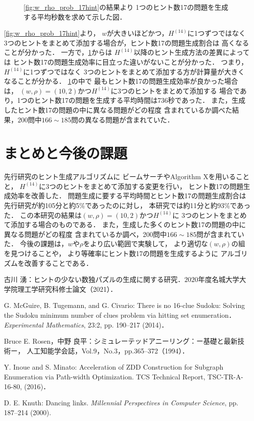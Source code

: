 \documentclass[a4paper, 9pt]{jarticle}
\begin{document}
\begin{論文概要}
\begin{figure}[bt]
  \caption{\figurename{\ref{fig:w_rho_prob_17hint}}の結果より
  1つのヒント数17の問題を生成する平均秒数を求めて示した図．} 
  \label{fig:w_rho_efficiency_17hint}
\end{figure}
\figurename{\ref{fig:w_rho_prob_17hint}}より，
$w$が大きいほどかつ，$H^{(14)}$に1つずつではなく
3つのヒントをまとめて添加する場合が，ヒント数17の問題生成割合は
高くなることが分かった．
一方で，\figurename{\ref{fig:w_rho_efficiency_17hint}}からは
$H^{(14)}$以降のヒント生成方法の差異によっては
ヒント数17の問題生成効率に目立った違いがないことが分かった．
つまり，$H^{(14)}$に1つずつではなく
3つのヒントをまとめて添加する方が計算量が大きくなることが分かる．
\figurename{\ref{fig:w_rho_efficiency_17hint}}の中で
最もヒント数17の問題生成効率が良かった場合は，
$(w, \rho) = (10, 2)$かつ$H^{(14)}$に3つのヒントをまとめて添加する
場合であり，1つのヒント数17の問題を生成する平均時間は736秒であった．
また，生成したヒント数17の問題の中に異なる問題がどの程度
含まれているか調べた結果，200問中$166 \sim 185$問の異なる問題が含まれていた．

\section{まとめと今後の課題}
先行研究のヒント生成アルゴリズムに
ビームサーチやAlgorithm Xを用いることと，
$H^{(14)}$に3つのヒントをまとめて添加する変更を行い，
ヒント数17の問題生成効率を改善した．
問題生成に要する平均時間とヒント数17の問題生成割合は
先行研究が約105分と約5\%であったのに対し，
本研究では約11分と約93\%であった．
この本研究の結果は$(w, \rho) = (10, 2)$かつ$H^{(14)}$に
3つのヒントをまとめて添加する場合のものである．
また，生成した多くのヒント数17の問題の中に異なる問題がどの程度
含まれているか調べ，200問中$166 \sim 185$問が含まれていた．
今後の課題は，$w$や$\rho$をより広い範囲で実験して，
より適切な$(w, \rho)$の組を見つけることや，
より等確率にヒント数17の問題を生成するように
アルゴリズムを改善することである．

\begin{thebibliography}{10}

  古川 湧：ヒントの少ない数独パズルの生成に関する研究．$2020$年度名城大学大学院理工学研究科修士論文（2021）．

  G. McGuire, B. Tugemann, and G. Civario:
  There is no 16-clue Sudoku: Solving the Sudoku minimum number of clues problem via hitting set enumeration．
  {\it Experimental Mathematics}, 23:2, pp. 190--217 (2014)．

  Bruce E. Rosen，中野 良平：シミュレーテッドアニーリング：ー基礎と最新技術ー，
  人工知能学会誌，Vol.9，No.3，pp.365--372（1994）．
  
  Y. Inoue and S. Minato: Acceleration of ZDD Construction for Subgraph 
  Enumeration via Path-width Optimization. TCS Technical Report, 
  TSC-TR-A-16-80, (2016)．

  D. E. Knuth: Dancing links. 
  {\it Millennial Perspectives in Computer Science}, pp. 187--214 (2000).
  
\end{thebibliography}

\end{論文概要} %
\end{document}
